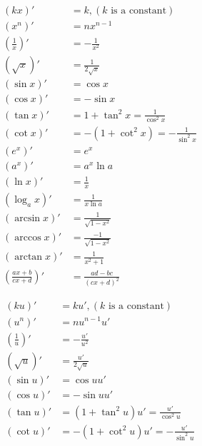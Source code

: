 \documentclass[a4paper, 11pt]{book}
\begin{document}
    \begin{multicols}{2}
        \begin{align}
            (kx)' &= k, (k \text{ is a constant})\\
            (x^{n})' &= nx^{n-1}\\
            \left(\frac{1}{x}\right)' &= -\frac{1}{x^{2}}\\
            (\sqrt{x})' &= \frac{1}{2\sqrt{x}}\\
            (\sin{x})' &= \cos{x}\\
            (\cos{x})' &= -\sin{x}\\
            (\tan{x})' &= 1 + \tan^{2}{x} = \frac{1}{\cos^{2}{x}}\\
            (\cot{x})' &= -(1+\cot^{2}{x}) = -\frac{1}{\sin^{2}{x}}\\
            (e^{x})' &= e^{x}\\
            (a^{x})' &= a^{x}\ln{a}\\
            (\ln{x})' &= \frac{1}{x}\\
            (\log_{a}x)' &= \frac{1}{x\ln{a}}\\
            (\arcsin{x})' &= \frac{1}{\sqrt{1-x^{2}}}\\
            (\arccos{x})' &= \frac{-1}{\sqrt{1-x^{2}}}\\
            (\arctan{x})' &= \frac{1}{x^{2} + 1}\\
            \left(\frac{ax+b}{cx+d}\right)' &= \frac{ad-bc}{(cx+d)^{2}}
        \end{align}
        \columnbreak
    
        \begin{align}
            (ku)' &= ku', (k \text{ is a constant})\\
            (u^{n})' &= nu^{n-1}u'\\
            \left(\frac{1}{u}\right)' &= -\frac{u'}{u^{2}}\\
            (\sqrt{u})' &= \frac{u'}{2\sqrt{u}}\\
            (\sin{u})' &= \cos{u}u'\\
            (\cos{u})' &= -\sin{u}u'\\
            (\tan{u})' &= (1 + \tan^{2}{u})u' = \frac{u'}{\cos^{2}{u}}\\
            (\cot{u})' &= -(1+\cot^{2}{u})u' = -\frac{u'}{\sin^{2}{u}}
        \end{align}
    \end{multicols}

\end{document}
